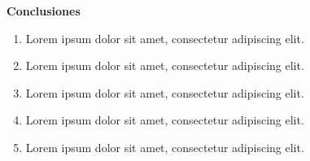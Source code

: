 \newpage
{} %
\vspace*{2cm} %
\begin{center}
	\Huge \textbf{Conclusiones} %
\end{center}
\doublespacing %
\raggedbottom %
\begin{enumerate}
	\item Lorem ipsum dolor sit amet, consectetur adipiscing elit.
	
	\item Lorem ipsum dolor sit amet, consectetur adipiscing elit.
	
	\item Lorem ipsum dolor sit amet, consectetur adipiscing elit.
    
	\item Lorem ipsum dolor sit amet, consectetur adipiscing elit.
	
	\item Lorem ipsum dolor sit amet, consectetur adipiscing elit.
	
\end{enumerate}